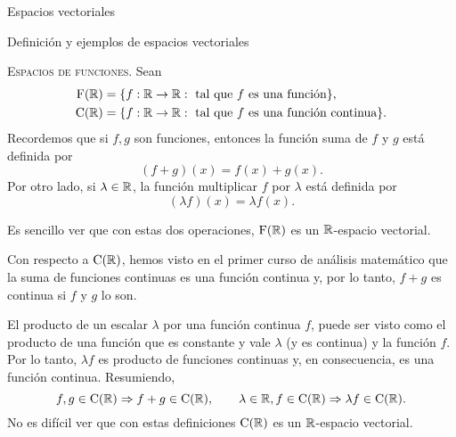 \begin{chapter}{Espacios vectoriales}
\begin{section}{Definici\'on y ejemplos de espacios vectoriales}
            
            \medspace
            
            \begin{ejemplo*}{\textsc{Espacios de funciones.}} Sean
                \begin{align*}
                \operatorname{F}(\mathbb R) &= \{f: \mathbb R \to \mathbb R: \text{ tal que } f \text{ es una función} \},\\
                \operatorname{C}(\mathbb R) &= \{f: \mathbb R \to \mathbb R: \text{ tal que }  f  \text{ es una función continua} \}.
                \end{align*}
                Recordemos que si $f,g$ son funciones, entonces la función suma de $f$ y $g$ está definida por
                \begin{equation*}
                (f+g)(x) = f(x) + g(x).
                \end{equation*}
                Por otro lado, si $\lambda \in \mathbb R$, la función multiplicar $f$ por $\lambda $ está definida por
                \begin{equation*}
                (\lambda f)(x) = \lambda f(x).
                \end{equation*}			
                                
                Es sencillo ver que con estas dos operaciones, $\operatorname{F}(\mathbb R)$ es un $\mathbb R$-espacio vectorial.
                
                Con respecto a $\operatorname{C}(\mathbb R)$, hemos visto en el primer curso de análisis matemático  que la suma de funciones continuas es una función continua y, por lo tanto, $f+g$ es continua si $f$ y $g$ lo son.  
                
                El producto de un escalar $\lambda$ por una función continua $f$,  puede ser visto como el producto de una función que es constante y vale $\lambda $ (y es continua) y la función $f$. Por lo tanto, $\lambda f$ es producto de funciones continuas y, en consecuencia, es una función continua.  Resumiendo,
                \begin{equation*}
                f, g \in \operatorname{C}(\mathbb R) \Rightarrow f+g \in \operatorname{C}(\mathbb R), \qquad \lambda \in \mathbb R, f \in \operatorname{C}(\mathbb R) \Rightarrow \lambda f \in \operatorname{C}(\mathbb R).
                \end{equation*}
                No es difícil ver que con estas definiciones $\operatorname{C}(\mathbb R)$  es un $\mathbb R$-espacio vectorial.
            \end{ejemplo*}
            

\end{section}
\end{chapter}
